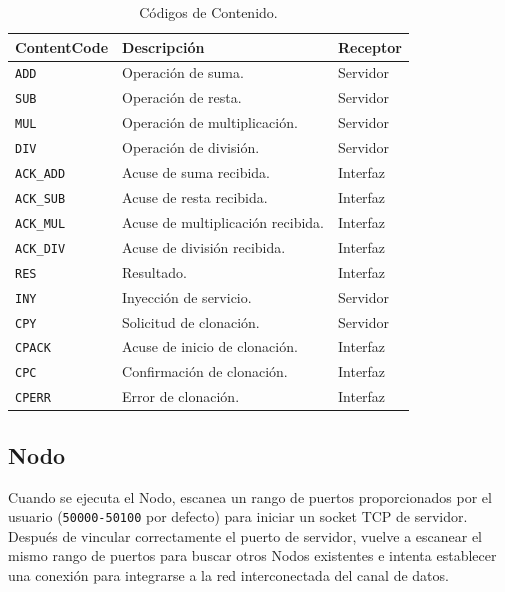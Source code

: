 \documentclass[conference,compsoc]{IEEEtran}
\begin{document}
\begin{table}[hb]
    \centering
    \caption{Códigos de Contenido.}
    \label{tab:cc}
    \begin{tabular}{|l|l|l|}
    \hline
    \textbf{ContentCode} & \textbf{Descripción}              & \textbf{Receptor} \\ \hline
    \texttt{ADD}         & Operación de suma.                & Servidor          \\ \hline
    \texttt{SUB}         & Operación de resta.               & Servidor          \\ \hline
    \texttt{MUL}         & Operación de multiplicación.      & Servidor          \\ \hline
    \texttt{DIV}         & Operación de división.            & Servidor          \\ \hline
    \texttt{ACK\_ADD}    & Acuse de suma recibida.           & Interfaz          \\ \hline
    \texttt{ACK\_SUB}    & Acuse de resta recibida.          & Interfaz          \\ \hline
    \texttt{ACK\_MUL}    & Acuse de multiplicación recibida. & Interfaz          \\ \hline
    \texttt{ACK\_DIV}    & Acuse de división recibida.       & Interfaz          \\ \hline
    \texttt{RES}         & Resultado.                        & Interfaz          \\ \hline
    \texttt{INY}         & Inyección de servicio.            & Servidor          \\ \hline
    \texttt{CPY}         & Solicitud de clonación.           & Servidor          \\ \hline
    \texttt{CPACK}       & Acuse de inicio de clonación.     & Interfaz          \\ \hline
    \texttt{CPC}         & Confirmación de clonación.        & Interfaz          \\ \hline
    \texttt{CPERR}       & Error de clonación.               & Interfaz          \\ \hline
    \end{tabular}
\end{table}

\subsection{Nodo}

Cuando se ejecuta el Nodo, escanea un rango de puertos proporcionados por el usuario (\texttt{50000-50100} por defecto) para iniciar un socket TCP de servidor. Después de vincular correctamente el puerto de servidor, vuelve a escanear el mismo rango de puertos para buscar otros Nodos existentes e intenta establecer una conexión para integrarse a la red interconectada del canal de datos.
\end{document}
